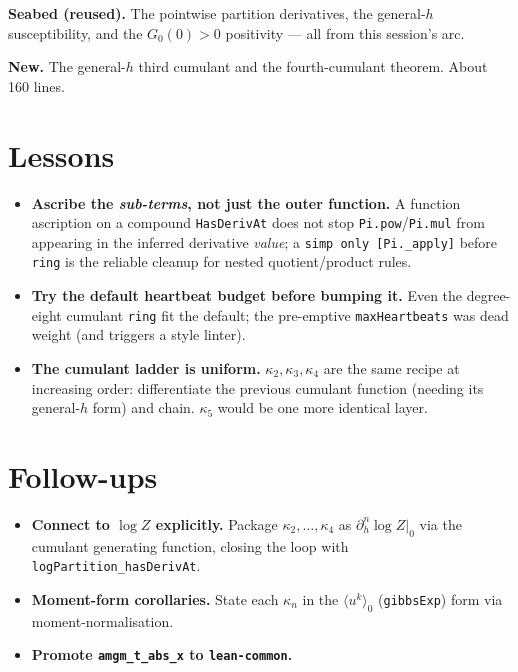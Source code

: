 \documentclass[11pt]{article}
\begin{document}
\textbf{Seabed (reused).} The pointwise partition derivatives, the general-$h$
susceptibility, and the $G_0(0)>0$ positivity --- all from this session's arc.

\textbf{New.} The general-$h$ third cumulant and the fourth-cumulant theorem.
About 160 lines.

\section{Lessons}

\begin{itemize}[itemsep=3pt]
\item \textbf{Ascribe the \emph{sub-terms}, not just the outer function.} A
  function ascription on a compound \texttt{HasDerivAt} does not stop
  \texttt{Pi.pow}/\texttt{Pi.mul} from appearing in the inferred derivative
  \emph{value}; a \texttt{simp only [Pi.\_apply]} before \texttt{ring} is the
  reliable cleanup for nested quotient/product rules.
\item \textbf{Try the default heartbeat budget before bumping it.} Even the
  degree-eight cumulant \texttt{ring} fit the default; the pre-emptive
  \texttt{maxHeartbeats} was dead weight (and triggers a style linter).
\item \textbf{The cumulant ladder is uniform.} $\kappa_2,\kappa_3,\kappa_4$ are
  the same recipe at increasing order: differentiate the previous cumulant
  function (needing its general-$h$ form) and chain. $\kappa_5$ would be one
  more identical layer.
\end{itemize}

\section{Follow-ups}

\begin{itemize}[itemsep=3pt]
\item \textbf{Connect to $\log Z$ explicitly.} Package $\kappa_2,\dots,\kappa_4$
  as $\partial_h^n \log Z|_0$ via the cumulant generating function, closing the
  loop with \texttt{logPartition\_hasDerivAt}.
\item \textbf{Moment-form corollaries.} State each $\kappa_n$ in the
  $\langle u^k\rangle_0$ (\texttt{gibbsExp}) form via moment-normalisation.
\item \textbf{Promote \texttt{amgm\_t\_abs\_x} to \texttt{lean-common}.}
\end{itemize}
\end{document}
